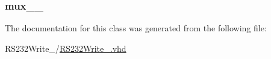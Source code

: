 \subsubsection[{u02}]{ {\bfseries \textcolor{vhdlchar}{mux\+\_\+\_}\textcolor{vhdlchar}{ }} \hspace{0.3cm}{\ttfamily [Instantiation]}}\label{class_r_s232_write__16_1_1moore_a59af0c0173456dd2b8087a3882ac1a52}


The documentation for this class was generated from the following file\+:\begin{DoxyCompactItemize}
\item 
R\+S232\+Write\+\_/\hyperlink{_r_s232_write__16_8vhd}{R\+S232\+Write\+\_.\+vhd}\end{DoxyCompactItemize}
